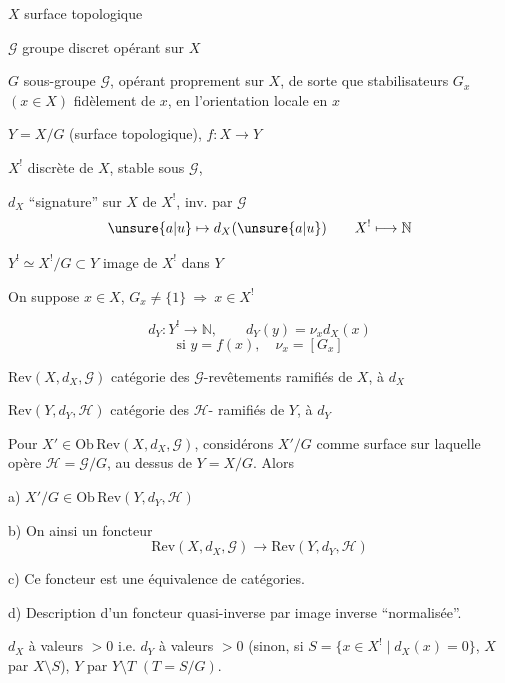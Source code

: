
$X$ surface topologique

$\mathcal G$ groupe discret opérant sur $X$

$G$ sous-groupe   $\mathcal G$, opérant
proprement sur $X$, de sorte que 
 stabilisateurs $G_x$ $(x\in X)$
 fidèlement  de $x$, en
 l'orientation locale en $x$

$Y=X/G$ (surface topologique), $f\colon X\to Y$

$X^{!}$  discrète de $X$, stable sous $\mathcal G$,

$d_X$ ``signature'' sur $X$ de  $X^{!}$, inv. par $\mathcal G$
\[
\unsure{a|u}\mapsto d_X(\unsure{a|u})
\qquad X^{!}\longmapsto\mathbb N
\]

$Y^{!}\simeq X^{!}/G\subset Y$ \quad image de $X^{!}$ dans $Y$

On suppose $x\in X$, $G_x\ne\{1\}\ \Rightarrow\ x\in X^{!}$

\[
d_Y\colon Y^{!}\to\mathbb N,\qquad d_Y(y)=\nu_x d_X(x)
\]
\[
\text{si } y=f(x),\quad \nu_x=[G_x]
\]

$\mathrm{Rev}(X,d_X,\mathcal G)$ catégorie des $\mathcal G$-revêtements
ramifiés de $X$,  à $d_X$

$\mathrm{Rev}(Y,d_Y,\mathcal H)$ catégorie des $\mathcal H$-
ramifiés de $Y$,  à $d_Y$

Pour $X'\in\mathrm{Ob}\,\mathrm{Rev}(X,d_X,\mathcal G)$, considérons
$X'/G$ comme surface sur laquelle opère
$\mathcal H=\mathcal G/G$, au dessus de $Y=X/G$. Alors



 a) $X'/G\in\mathrm{Ob}\,\mathrm{Rev}(Y,d_Y,\mathcal H)$

 b) On  ainsi un foncteur
\[
\mathrm{Rev}(X,d_X,\mathcal G)\longrightarrow
\mathrm{Rev}(Y,d_Y,\mathcal H) \tag{19}
\]

 c) Ce foncteur est une équivalence de catégories.

 d) Description d'un foncteur quasi-inverse par image inverse ``normalisée''.

  $d_X$ à valeurs $>0$ i.e. $d_Y$ à valeurs
$>0$ (sinon, si $S=\{x\in X^{!}\mid d_X(x)=0\}$, 
$X$ par $X\setminus S$), $Y$ par $Y\setminus T$ $(T=S/G)$.

